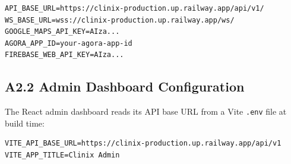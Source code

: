 \begin{lstlisting}[caption={Sample \texttt{.env} for the Flutter mobile app}]
API_BASE_URL=https://clinix-production.up.railway.app/api/v1/
WS_BASE_URL=wss://clinix-production.up.railway.app/ws/
GOOGLE_MAPS_API_KEY=AIza...
AGORA_APP_ID=your-agora-app-id
FIREBASE_WEB_API_KEY=AIza...
\end{lstlisting}

\subsection*{A2.2 Admin Dashboard Configuration}

The React admin dashboard reads its API base URL from a Vite
\texttt{.env} file at build time:

\begin{lstlisting}[caption={Sample \texttt{.env} for the React admin dashboard}]
VITE_API_BASE_URL=https://clinix-production.up.railway.app/api/v1
VITE_APP_TITLE=Clinix Admin
\end{lstlisting}
